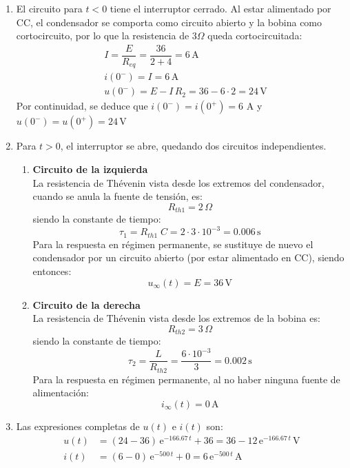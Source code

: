 \begin{enumerate}
    \item El circuito para $t<0$ tiene el interruptor cerrado. Al estar alimentado por CC, el condensador se comporta como circuito abierto y la bobina como cortocircuito, por lo que la resistencia de $3\Omega$ queda cortocircuitada:
    \begin{align*}
        &I=\dfrac{E}{R_{eq}}=\dfrac{36}{2+4}=6\,\si{\ampere}\\
        &i(0^-)=I=6\,\si{\ampere}\\
        &u(0^-)=E-I\,R_2=36-6\cdot 2=24\,\si{\volt}
    \end{align*}
    Por continuidad, se deduce que $i(0^-)=i(0^+)=6$ A y $u(0^-)=u(0^+)=24\,\si{\volt}$
    \item Para $t>0$, el interruptor se abre, quedando dos circuitos independientes. 
    \begin{enumerate}
        \item \textbf{Circuito de la izquierda}\\
        La resistencia de Thévenin vista desde los extremos del condensador, cuando se anula la fuente de tensión, es:
    \begin{equation*}
        R_{th1}=2\,\Omega
    \end{equation*}
    siendo la constante de tiempo:
    \begin{equation*}
        \tau_1=R_{th1}\;C=2\cdot 3\cdot10^{-3}=0.006\,\si{\second}
    \end{equation*}
    Para la respuesta en régimen permanente, se sustituye de nuevo el condensador por un circuito abierto (por estar alimentado en CC), siendo entonces:
    \begin{equation*}
        u_{\infty}(t)=E=36\,\si{\volt}
    \end{equation*}
    \item \textbf{Circuito de la derecha}\\
        La resistencia de Thévenin vista desde los extremos de la bobina es:
    \begin{equation*}
        R_{th2}=3\,\Omega
    \end{equation*}
    siendo la constante de tiempo:
    \begin{equation*}
        \tau_2=\dfrac{L}{R_{th2}}=\dfrac{6\cdot 10^{-3}}{3}=0.002\,\si{\second}
    \end{equation*}
    Para la respuesta en régimen permanente, al no haber ninguna fuente de alimentación:
    \begin{equation*}
        i_{\infty}(t)=0\,\si{\ampere}
    \end{equation*}
    \end{enumerate}
    \item Las expresiones completas de $u(t)$ e $i(t)$ son:
    \begin{align*}
        u(t)&=\left(24-36 \right)\,\mathrm{e}^{-166.67\,t}+36=36-12\,\mathrm{e}^{-166.67\,t}\,\si{\volt}\\
        i(t)&=\left(6-0 \right)\,\mathrm{e}^{-500\,t}+0=6\,\mathrm{e}^{-500\,t}\,\si{\ampere}
    \end{align*}
\end{enumerate}


